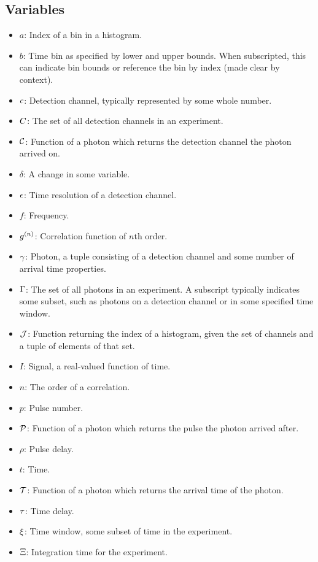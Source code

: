 \begin{appendix}
\subsection{Variables}
\begin{itemize}
\item $a$: Index of a bin in a histogram.
\item $b$: Time bin as specified by lower and upper bounds. When subscripted, this can indicate bin bounds or reference the bin by index (made clear by context).
\item $c$: Detection channel, typically represented by some whole number.
\item $C$: The set of all detection channels in an experiment.
\item $\mathcal{C}$: Function of a photon which returns the detection channel the photon arrived on.
\item $\delta$: A change in some variable.
\item $\epsilon$: Time resolution of a detection channel.
\item $f$: Frequency.
\item $g^{(n)}$: Correlation function of $n$th order.
\item $\gamma$: Photon, a tuple consisting of a detection channel and some number of arrival time properties.
\item $\Gamma$: The set of all photons in an experiment. A subscript typically indicates some subset, such as photons on a detection channel or in some specified time window.
\item $\mathcal{J}$: Function returning the index of a histogram, given the set of channels and a tuple of elements of that set.
\item $I$: Signal, a real-valued function of time.
\item $n$: The order of a correlation.
\item $p$: Pulse number.
\item $\mathcal{P}$: Function of a photon which returns the pulse the photon arrived after.
\item $\rho$: Pulse delay.
\item $t$: Time.
\item $\mathcal{T}$: Function of a photon which returns the arrival time of the photon.
\item $\tau$:  Time delay.
\item $\xi$: Time window, some subset of time in the experiment.
\item $\Xi$: Integration time for the experiment.
\end{itemize}


\end{appendix}
